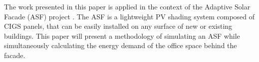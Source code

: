 The work presented in this paper is applied in the context of the Adaptive Solar Facade (ASF) project \cite{nagy2015frontiers}. The ASF is a lightweight PV shading system composed of CIGS panels, that can be easily installed on any surface of new or existing buildings. This paper will present a methodology of simulating an ASF while simultaneously calculating the energy demand of the office space behind the facade.











